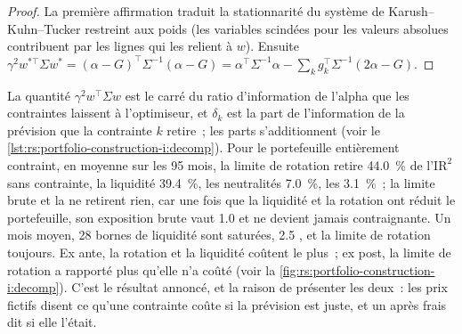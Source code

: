 \begin{proof}
La première affirmation traduit la stationnarité du système de Karush--Kuhn--Tucker restreint aux poids (les variables scindées pour les valeurs absolues contribuent
par les lignes qui les relient à $w$). Ensuite $\gamma^2 w^{*\top}\Sigma w^* = (\alpha - G)^\top\Sigma^{-1}(\alpha - G) = \alpha^\top\Sigma^{-1}\alpha - \sum_k
g_k^\top\Sigma^{-1}(2\alpha - G)$.
\end{proof}

La quantité $\gamma^2 w^\top\Sigma w$ est le carré du ratio d'information de l'alpha que les contraintes laissent à l'optimiseur, et $\delta_k$ est la part
de l'information de la prévision que la contrainte $k$ retire~; les parts s'additionnent (voir le \cref{lst:rs:portfolio-construction-i:decomp}). Pour le portefeuille entièrement contraint,
en moyenne sur les 95 mois, la limite de rotation retire 44.0~\% de l'$\mathrm{IR}^2$ sans contrainte, la liquidité 39.4~\%, les neutralités 7.0~\%, les  3.1~\%~;
la limite brute et la  ne retirent rien, car une fois que la liquidité et la rotation ont réduit le portefeuille, son exposition brute vaut 1.0 et ne devient jamais contraignante. Un mois moyen,
28 bornes de liquidité sont saturées, 2.5 , et la limite de rotation toujours. Ex ante, la rotation et la liquidité coûtent le plus~; ex post, la limite de rotation a rapporté plus qu'elle n'a coûté
(voir la \cref{fig:rs:portfolio-construction-i:decomp}). C'est le résultat annoncé, et la raison de présenter les deux~: les prix fictifs disent ce qu'une contrainte coûte si la
prévision est juste, et un  après frais dit si elle l'était.

\begin{omfigure}

\label{fig:rs:portfolio-construction-i:decomp}
\end{omfigure}

